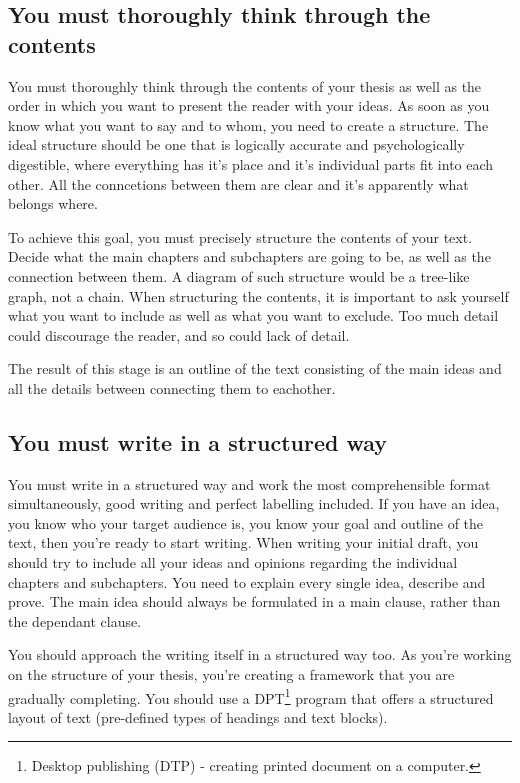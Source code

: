 \subsection*{You must thoroughly think through the contents}
You must thoroughly think through the contents of your thesis as well as the order in which you want to present the reader with your ideas. As soon as you know what you want to say and to whom, you need to create a structure. The ideal structure should be one that is logically accurate and psychologically digestible, where everything has it's place and it's individual parts fit into each other. All the conncetions between them are clear and it's apparently what belongs where.

To achieve this goal, you must precisely structure the contents of your text. Decide what the main chapters and subchapters are going to be, as well as the connection between them. A diagram of such structure would be a tree-like graph, not a chain. When structuring the contents, it is important to ask yourself what you want to include as well as what you want to exclude. Too much detail could discourage the reader, and so could lack of detail.

The result of this stage is an outline of the text consisting of the main ideas and all the details between connecting them to eachother.

\subsection*{You must write in a structured way}

You must write in a structured way and work the most comprehensible format simultaneously, good writing and perfect labelling included. If you have an idea, you know who your target audience is, you know your goal and outline of the text, then you're ready to start writing. When writing your initial draft, you should try to include all your ideas and opinions regarding the individual chapters and subchapters. You need to explain every single idea, describe and prove. The main idea should always be formulated in a main clause, rather than the dependant clause.

You should approach the writing itself in a structured way too. As you're working on the structure of your thesis, you're creating a framework that you are gradually completing. You should use a DPT\footnote{Desktop publishing (DTP) - creating printed document on a computer.} program that offers a structured layout of text (pre-defined types of headings and text blocks).

